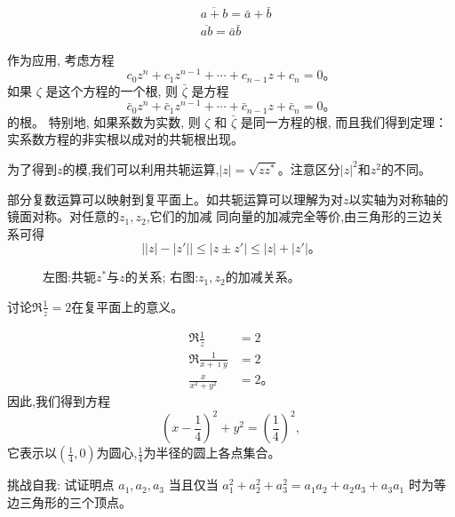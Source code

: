 \begin{equation}
    \begin{aligned}
    & \overline{a+b}=\bar{a}+\bar{b} \\
    & \overline{a b}=\bar{a} \bar{b}
    \end{aligned}
\end{equation}

作为应用, 考虑方程
$$
c_0 z^n+c_1 z^{n-1}+\cdots+c_{n-1} z+c_n=0 。
$$
如果 $\zeta$ 是这个方程的一个根, 则 $\bar{\zeta}$ 是方程
$$
\bar{c}_0 z^n+\bar{c}_1 z^{n-1}+\cdots+\bar{c}_{n-1} z+\bar{c}_n=0 。
$$
的根。 特别地, 如果系数为实数, 则 $\zeta$ 和 $\bar{\zeta}$ 是同一方程的根, 
而且我们得到定理：实系数方程的非实根以成对的共轭根出现。

为了得到$z$的模,我们可以利用共轭运算,$|z| = \sqrt{zz^{*}}$。注意区分$|z|^2$和$z^2$的不同。

部分复数运算可以映射到复平面上。如共轭运算可以理解为对$z$以实轴为对称轴的镜面对称。对任意的$z_1,z_2$,它们的加减
同向量的加减完全等价,由三角形的三边关系可得
\begin{equation}
    \left| |z|- |z'| \right| \leq |z \pm z'| \leq |z| + |z'| 。
\end{equation}
\begin{figure}[h]
    \centering
    
\quad 
        
        \caption{左图:共轭$z^{*}$与$z$的关系; 右图:$z_1, z_2$的加减关系。}
\end{figure}
 

\begin{example}
讨论$\Re \frac{1}{z} = 2$在复平面上的意义。
\end{example}
\begin{solution}
    \begin{align*}
        \Re \frac{1}{z} &= 2\\
        \Re \frac{1}{x+\imath y} &  = 2 \\
        \frac{x}{x^2 +y^2} & = 2 。
    \end{align*}
因此,我们得到方程
\[
    (x-\frac{1}{4})^2 + y^2 = \left( \frac{1}{4}\right)^2,
\]
它表示以$(\frac{1}{4},0)$为圆心,$\frac{1}{4}$为半径的圆上各点集合。
\end{solution}
        

\begin{note}
    挑战自我: 试证明点 $a_1, a_2, a_3$ 当且仅当 
    $a_1^2+a_2^2+a_3^2=a_1 a_2+a_2 a_3+a_3 a_1$ 时为等边三角形的三个顶点。    
\end{note}


